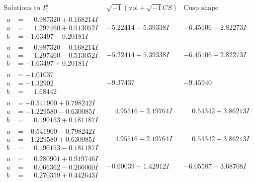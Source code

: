 \documentclass[1p]{elsarticle_modified}
\theoremstyle{definition}
\newcommand{\I}{\sqrt{-1}}
\begin{document}
$$\begin{array}{c|c|c}  
\text{Solutions to }I^u_{1}& \I (\text{vol} + \sqrt{-1}CS) & \text{Cusp shape}\\
 \hline 
\begin{aligned}
u &= \phantom{-}0.987320 + 0.168214 I \\
a &= \phantom{-}1.297460 + 0.513052 I \\
b &= -1.63497 - 0.20181 I\end{aligned}
 & -5.22414 - 5.39338 I & -6.45106 + 2.82273 I \\ \hline\begin{aligned}
u &= \phantom{-}0.987320 - 0.168214 I \\
a &= \phantom{-}1.297460 - 0.513052 I \\
b &= -1.63497 + 0.20181 I\end{aligned}
 & -5.22414 + 5.39338 I & -6.45106 - 2.82273 I \\ \hline\begin{aligned}
u &= -1.01037\phantom{ +0.000000I} \\
a &= -1.32902\phantom{ +0.000000I} \\
b &= \phantom{-}1.68442\phantom{ +0.000000I}\end{aligned}
 & -9.37437\phantom{ +0.000000I} & -9.45940\phantom{ +0.000000I} \\ \hline\begin{aligned}
u &= -0.541900 + 0.798242 I \\
a &= -1.229580 - 0.630085 I \\
b &= \phantom{-}0.190153 + 0.181187 I\end{aligned}
 & \phantom{-}4.95516 - 2.19764 I & \phantom{-}0.54342 + 3.86213 I \\ \hline\begin{aligned}
u &= -0.541900 - 0.798242 I \\
a &= -1.229580 + 0.630085 I \\
b &= \phantom{-}0.190153 - 0.181187 I\end{aligned}
 & \phantom{-}4.95516 + 2.19764 I & \phantom{-}0.54342 - 3.86213 I \\ \hline\begin{aligned}
u &= \phantom{-}0.280901 + 0.919746 I \\
a &= \phantom{-}0.066362 - 0.266060 I \\
b &= \phantom{-}0.270359 + 0.442643 I\end{aligned}
 & -0.60039 + 1.42912 I & -6.05587 - 3.68708 I \\ \hline\begin{aligned}

\end{aligned}
\end{array}$$
\end{document}
